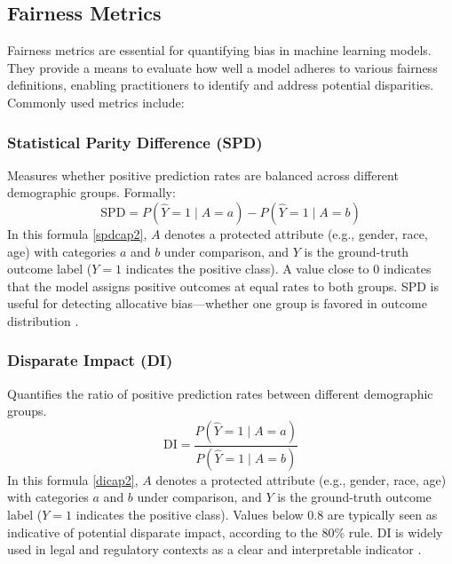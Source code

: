 \documentclass[12pt,a4paper,openright,twoside]{book}
\begin{document}
\subsection{Fairness Metrics}
Fairness metrics are essential for quantifying bias in machine learning models. They provide a means to evaluate how well a model adheres to various fairness definitions, enabling practitioners to identify and address potential disparities. Commonly used metrics include:

\subsubsection{Statistical Parity Difference (SPD)}
Measures whether positive prediction rates are balanced across different demographic groups. Formally:
\begin{equation}
    \text{SPD} = P(\hat{Y}=1 \mid A=a) - P(\hat{Y}=1 \mid A=b)
    \label{spdcap2}
\end{equation}
In this formula \ref{spdcap2}, $A$ denotes a protected attribute (e.g., gender, race, age) with categories $a$ and $b$ under comparison, and $Y$ is the ground-truth outcome label ($Y=1$ indicates the positive class).  
A value close to 0 indicates that the model assigns positive outcomes at equal rates to both groups. SPD is useful for detecting allocative bias—whether one group is favored in outcome distribution \cite{dwork2011fairnessawareness}.

\subsubsection{Disparate Impact (DI)}
Quantifies the ratio of positive prediction rates between different demographic groups.
\begin{equation}
    \text{DI} = \frac{P(\hat{Y}=1 \mid A=a)}{P(\hat{Y}=1 \mid A=b)}
    \label{dicap2}
\end{equation}
In this formula \ref{dicap2}, $A$ denotes a protected attribute (e.g., gender, race, age) with categories $a$ and $b$ under comparison, and $Y$ is the ground-truth outcome label ($Y=1$ indicates the positive class).  
Values below 0.8 are typically seen as indicative of potential disparate impact, according to the 80\% rule. DI is widely used in legal and regulatory contexts as a clear and interpretable indicator \cite{feldman2015certifyingremovingdisparateimpact}.
\end{document}
